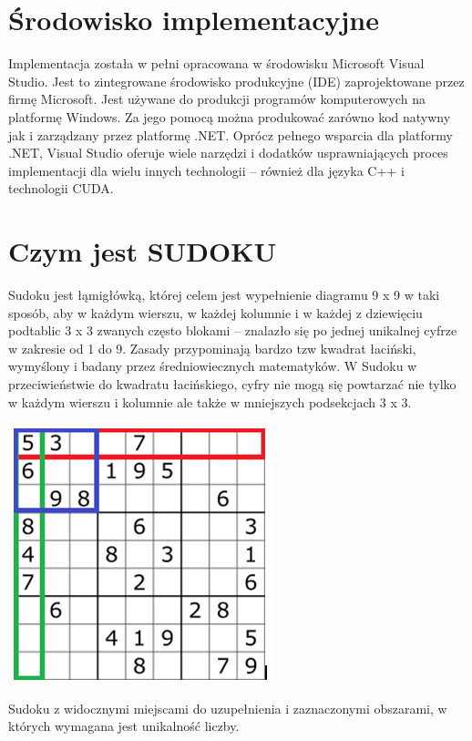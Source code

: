 \documentclass[a4paper,12pt]{article}
\begin{document}
\section{Środowisko implementacyjne}
Implementacja została w pełni opracowana w środowisku Microsoft Visual Studio. Jest to
zintegrowane środowisko produkcyjne (IDE) zaprojektowane przez firmę Microsoft. Jest
używane do produkcji programów komputerowych na platformę Windows. Za jego pomocą
można produkować zarówno kod natywny jak i zarządzany przez platformę .NET. Oprócz pełnego wsparcia dla platformy .NET, Visual Studio oferuje wiele narzędzi i dodatków usprawniających proces implementacji dla wielu innych technologii – również dla języka C++ i technologii CUDA.

\newpage
\section{Czym jest SUDOKU}
Sudoku jest łąmigłówką, której celem jest wypełnienie diagramu 9 x 9 w taki sposób, aby w każdym wierszu, w każdej kolumnie i w każdej z dziewięciu podtablic 3 x 3 zwanych często blokami – znalazło się po jednej unikalnej cyfrze w zakresie od 1 do 9. Zasady przypominają bardzo tzw kwadrat łaciński, wymyślony i badany przez średniowiecznych matematyków. W Sudoku w przeciwieństwie do kwadratu łacińskiego, cyfry nie mogą się powtarzać nie tylko w każdym wierszu i kolumnie ale także w mniejszych podsekcjach 3 x 3.

\begin{center}
  \includegraphics[scale=0.75]{p2.png}  
  \label{fig:picture2}
\end{center}
Sudoku z widocznymi miejscami do uzupełnienia i zaznaczonymi obszarami, w których wymagana jest unikalność liczby.
\end{document}
